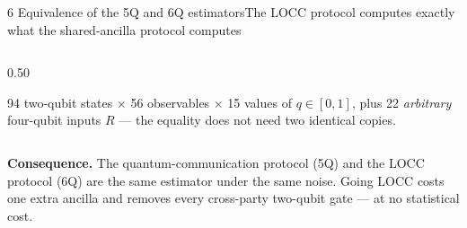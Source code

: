 \documentclass[aspectratio=169,10pt,t]{beamer}
\newcommand{\acc}[1]{{\color{qitaccent}#1}}
\begin{document}
\begin{frame}{6 \quad Equivalence of the 5Q and 6Q estimators}{The LOCC protocol computes exactly what the shared-ancilla protocol computes}
\begin{columns}[T,onlytextwidth]
\begin{column}{0.50\textwidth}
    \raggedright
    94 two-qubit states $\times$ 56 observables $\times$ 15 values of
    $q\in[0,1]$, plus 22 \emph{arbitrary} four-qubit inputs $R$ --- the
    equality does not need two identical copies.
  \end{column}
  \end{columns}
  \vfill
  {\footnotesize
   \textbf{Consequence.}\; The quantum-communication protocol (5Q) and the
   LOCC protocol (6Q) are \acc{the same estimator under the same noise}.
   Going LOCC costs one extra ancilla and removes every cross-party
   two-qubit gate --- at no statistical cost.}
  \vspace{0.4ex}
\end{frame}

\end{document}
